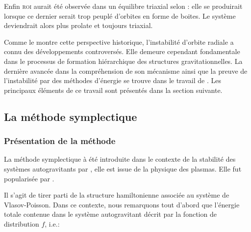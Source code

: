 Enfin \textsc{roi} aurait été observée dans un équilibre triaxial selon \cite{antonini}: elle se produirait lorsque ce dernier serait trop peuplé
d'orbites en forme de boites. Le système deviendrait alors plus prolate et toujours triaxial.

Comme le montre cette perspective historique, l'instabilité d'orbite radiale a connu des développements controversés. Elle demeure cependant
fondamentale dans le processus de formation hiérarchique des structures gravitationnelles. La dernière avancée dans la compréhension de son mécanisme
ainsi que la preuve de l'instabilité par des méthodes d'énergie se trouve dans le travail de \cite{future}. Les principaux éléments
de ce travail sont présentés dans la section suivante.

\subsection{La méthode symplectique}

\subsubsection{Présentation de la méthode}

La méthode symplectique à été introduite dans le contexte de la stabilité des systèmes autogravitants par \cite{bartho}, elle est issue de
la physique des plasmas. Elle fut popularisée par \cite{kandrupstability}.

Il s'agit de tirer parti de la structure hamiltonienne associée au système de Vlasov-Poisson. Dans ce contexte, nous remarquons tout d'abord que
l'énergie totale contenue dans le système autogravitant décrit par la fonction de distribution $f$, i.e.:

